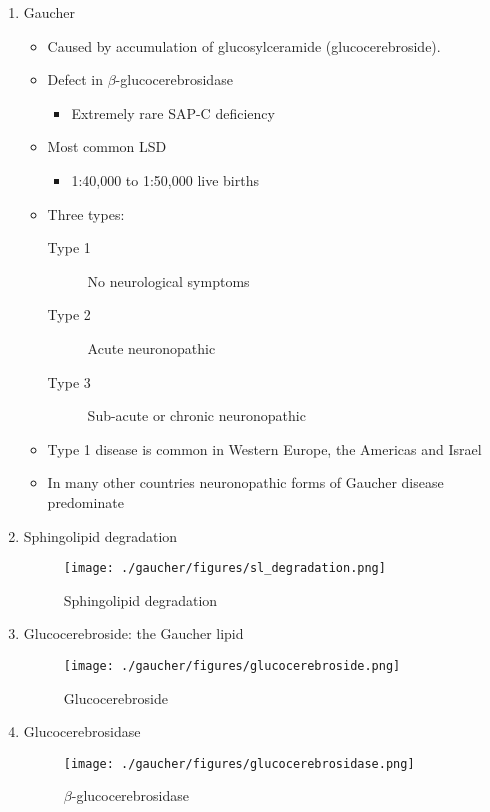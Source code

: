 \documentclass{scrartcl}
\begin{document}
\begin{enumerate}
\item Gaucher
\label{sec:org6310561}
\begin{itemize}
\item Caused by accumulation of glucosylceramide (glucocerebroside).
\item Defect in \(\beta\)-glucocerebrosidase
\begin{itemize}
\item Extremely rare SAP-C deficiency
\end{itemize}
\item Most common LSD
\begin{itemize}
\item 1:40,000 to 1:50,000 live births
\end{itemize}
\item Three types:
\begin{description}
\item[{Type 1}] No neurological symptoms
\item[{Type 2}] Acute neuronopathic
\item[{Type 3}] Sub-acute or chronic neuronopathic
\end{description}
\item Type 1 disease is common in Western Europe, the Americas and Israel
\item In many other countries neuronopathic forms of Gaucher disease predominate
\end{itemize}

\item Sphingolipid degradation
\label{sec:org1536c0b}

\begin{figure}[htbp]
\centering
\texttt{[image: ./gaucher/figures/sl\_degradation.png]}
\caption{\label{fig:org8548e86}
Sphingolipid degradation}
\end{figure}

\item Glucocerebroside: the Gaucher lipid
\label{sec:org8fafbbe}

\begin{figure}[htbp]
\centering
\texttt{[image: ./gaucher/figures/glucocerebroside.png]}
\caption{\label{fig:org325ac18}
Glucocerebroside}
\end{figure}

\item Glucocerebrosidase
\label{sec:org4737409}


\begin{figure}[htbp]
\centering
\texttt{[image: ./gaucher/figures/glucocerebrosidase.png]}
\caption{\label{fig:org1fb5d97}
\(\beta\)-glucocerebrosidase}
\end{figure}


\end{enumerate}
\end{document}
